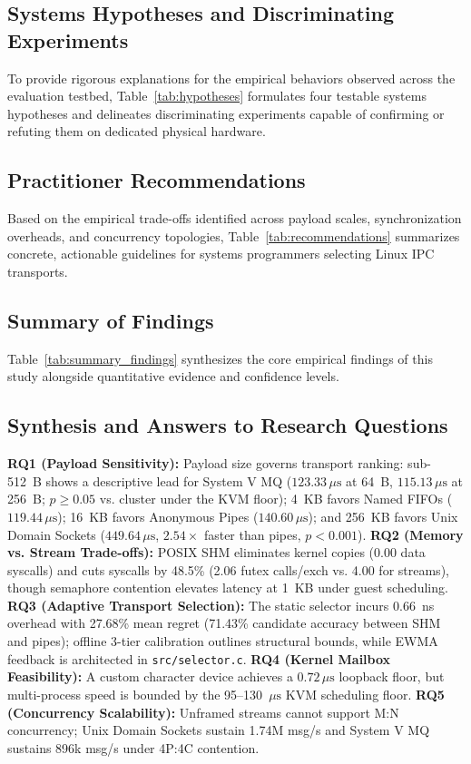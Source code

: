 \subsection{Systems Hypotheses and Discriminating Experiments}


To provide rigorous explanations for the empirical behaviors observed across the evaluation testbed, Table~\ref{tab:hypotheses} formulates four testable systems hypotheses and delineates discriminating experiments capable of confirming or refuting them on dedicated physical hardware.

\subsection{Practitioner Recommendations}


Based on the empirical trade-offs identified across payload scales, synchronization overheads, and concurrency topologies, Table~\ref{tab:recommendations} summarizes concrete, actionable guidelines for systems programmers selecting Linux IPC transports.

\subsection{Summary of Findings}
Table~\ref{tab:summary_findings} synthesizes the core empirical findings of this study alongside quantitative evidence and confidence levels.

\subsection{Synthesis and Answers to Research Questions}
\textbf{RQ1 (Payload Sensitivity):} Payload size governs transport ranking: sub-512~B shows a descriptive lead for System V MQ ($123.33\,\mu\text{s}$ at 64~B, $115.13\,\mu\text{s}$ at 256~B; $p \ge 0.05$ vs. cluster under the KVM floor); 4~KB favors Named FIFOs ($119.44\,\mu\text{s}$); 16~KB favors Anonymous Pipes ($140.60\,\mu\text{s}$); and 256~KB favors Unix Domain Sockets ($449.64\,\mu\text{s}$, $2.54\times$ faster than pipes, $p < 0.001$).
\textbf{RQ2 (Memory vs. Stream Trade-offs):} POSIX SHM eliminates kernel copies (0.00 data syscalls) and cuts syscalls by 48.5\% (2.06 futex calls/exch vs. 4.00 for streams), though semaphore contention elevates latency at 1~KB under guest scheduling.
\textbf{RQ3 (Adaptive Transport Selection):} The static selector incurs 0.66~ns overhead with 27.68\% mean regret (71.43\% candidate accuracy between SHM and pipes); offline 3-tier calibration outlines structural bounds, while EWMA feedback is architected in \texttt{src/selector.c}.
\textbf{RQ4 (Kernel Mailbox Feasibility):} A custom character device achieves a $0.72\,\mu\text{s}$ loopback floor, but multi-process speed is bounded by the 95--130~$\mu\text{s}$ KVM scheduling floor.
\textbf{RQ5 (Concurrency Scalability):} Unframed streams cannot support M:N concurrency; Unix Domain Sockets sustain 1.74M msg/s and System V MQ sustains 896k msg/s under 4P:4C contention.

